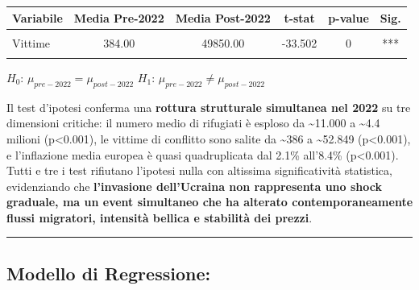 \documentclass[
  letterpaper,
  DIV=11,
  numbers=noendperiod]{scrartcl}
\begin{document}
\begin{table}[!h]
\centering\begingroup\fontsize{7}{9}\selectfont

\begin{tabular}{lccccc}
\toprule
\textbf{Variabile} & \textbf{Media Pre-2022} & \textbf{Media Post-2022} & \textbf{t-stat} & \textbf{p-value} & \textbf{Sig.}\\
\midrule
\cellcolor{gray!10}{Rifugiati} & \cellcolor{gray!10}{374.00} & \cellcolor{gray!10}{146067.00} & \cellcolor{gray!10}{-5.652} & \cellcolor{gray!10}{0} & \cellcolor{gray!10}{***}\\
Vittime & 384.00 & 49850.00 & -33.502 & 0 & ***\\
\cellcolor{gray!10}{Inflazione (\%)} & \cellcolor{gray!10}{1.86} & \cellcolor{gray!10}{6.81} & \cellcolor{gray!10}{-9.307} & \cellcolor{gray!10}{0} & \cellcolor{gray!10}{***}\\
\bottomrule
\end{tabular}
\endgroup{}
\end{table}

\begin{center}
$H_0$: $\mu_{pre-2022} = \mu_{post-2022}$ \quad $H_1$: $\mu_{pre-2022} \neq \mu_{post-2022}$
\end{center}

\vspace{0.3cm}

\small

Il test d'ipotesi conferma una \textbf{rottura strutturale simultanea
nel 2022} su tre dimensioni critiche: il numero medio di rifugiati è
esploso da \textasciitilde11.000 a \textasciitilde4.4 milioni
(p\textless0.001), le vittime di conflitto sono salite da
\textasciitilde386 a \textasciitilde52.849 (p\textless0.001), e
l'inflazione media europea è quasi quadruplicata dal 2.1\% all'8.4\%
(p\textless0.001). Tutti e tre i test rifiutano l'ipotesi nulla con
altissima significatività statistica, evidenziando che
\textbf{l'invasione dell'Ucraina non rappresenta uno shock graduale, ma
un event simultaneo che ha alterato contemporaneamente flussi migratori,
intensità bellica e stabilità dei prezzi}.

\begin{center}\rule{0.5\linewidth}{0.5pt}\end{center}

\subsection{Modello di Regressione:}\label{modello-di-regressione}
\end{document}
